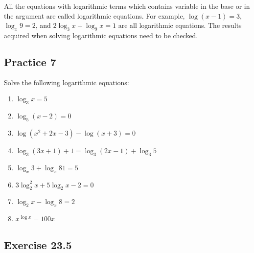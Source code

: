 \documentclass[12pt]{report}
\begin{document}
All the equations with logarithmic terms which contains variable in the base or
in the argument are called logarithmic equations. For example, $\log(x-1) = 3$,
$\log_x 9 = 2$, and $2\log_3 x + \log_9 x = 1$ are all logarithmic equations.
The results acquired when solving logarithmic equations need to be checked.

\subsection*{Practice 7}

\setlength{\columnseprule}{1pt}
\setlength{\columnsep}{24pt}
\begin{multicols}{2}

    Solve the following logarithmic equations:
    \begin{enumerate}
        \item $\log_3 x=5$
        \item $\log_{5}(x-2)=0$
        \item $\log(x^{2}+2x-3)-\log(x+3)=0$
        \item $\log_{3}(3x+1)+1=\log_{3}(2x-1)+\log_{3}5$
        \item $\log_{x}3+\log_{x}81=5$
        \item $3\log_{2}^{2}x+5\log_{2}x-2=0$
        \item $\log_{2}x-\log_{x}8=2$
        \item $x^{\log x}=100x$
    \end{enumerate}

\end{multicols}

\subsection*{Exercise 23.5}
\end{document}
